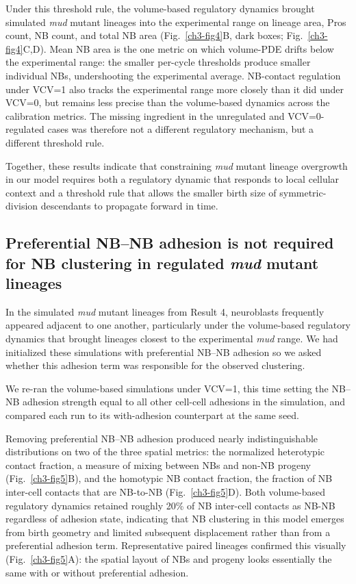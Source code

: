 Under this threshold rule, the volume-based regulatory dynamics brought simulated \textit{mud} mutant lineages into the experimental range on lineage area, Pros count, NB count, and total NB area (Fig.~\ref{ch3-fig4}B, dark boxes; Fig.~\ref{ch3-fig4}C,D).
Mean NB area is the one metric on which volume-PDE drifts below the experimental range: the smaller per-cycle thresholds produce smaller individual NBs, undershooting the experimental average. %
NB-contact regulation under VCV=1 also tracks the experimental range more closely than it did under VCV=0, but remains less precise than the volume-based dynamics across the calibration metrics.
The missing ingredient in the unregulated and VCV=0-regulated cases was therefore not a different regulatory mechanism, but a different threshold rule.

Together, these results indicate that constraining \textit{mud} mutant lineage overgrowth in our model requires both a regulatory dynamic that responds to local cellular context and a threshold rule that allows the smaller birth size of symmetric-division descendants to propagate forward in time.

\subsection{Preferential NB–NB adhesion is not required for NB clustering in regulated \textit{mud} mutant lineages}

In the simulated \textit{mud} mutant lineages from Result 4, neuroblasts frequently appeared adjacent to one another, particularly under the volume-based regulatory dynamics that brought lineages closest to the experimental \textit{mud} range.
We had initialized these simulations with preferential NB–NB adhesion so we asked whether this adhesion term was responsible for the observed clustering.

We re-ran the volume-based simulations under VCV=1, this time setting the NB–NB adhesion strength equal to all other cell-cell adhesions in the simulation, and compared each run to its with-adhesion counterpart at the same seed.

Removing preferential NB–NB adhesion produced nearly indistinguishable distributions on two of the three spatial metrics: the normalized heterotypic contact fraction, a measure of mixing between NBs and non-NB progeny (Fig.~\ref{ch3-fig5}B), and the homotypic NB contact fraction, the fraction of NB inter-cell contacts that are NB-to-NB (Fig.~\ref{ch3-fig5}D).
Both volume-based regulatory dynamics retained roughly 20\% of NB inter-cell contacts as NB-NB regardless of adhesion state, indicating that NB clustering in this model emerges from birth geometry and limited subsequent displacement rather than from a preferential adhesion term.
Representative paired lineages confirmed this visually (Fig.~\ref{ch3-fig5}A): the spatial layout of NBs and progeny looks essentially the same with or without preferential adhesion.

